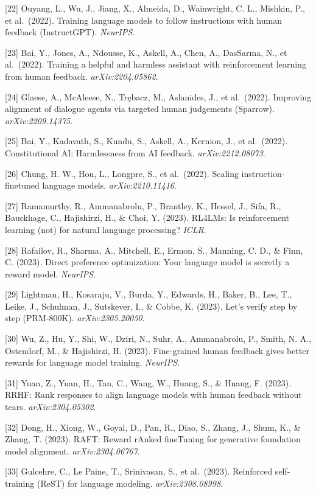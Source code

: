 {[}22{]} Ouyang, L., Wu, J., Jiang, X., Almeida, D., Wainwright, C. L., Mishkin, P., et al.~(2022). Training language models to follow instructions with human feedback (InstructGPT). \emph{NeurIPS}.

{[}23{]} Bai, Y., Jones, A., Ndousse, K., Askell, A., Chen, A., DasSarma, N., et al.~(2022). Training a helpful and harmless assistant with reinforcement learning from human feedback. \emph{arXiv:2204.05862}.

{[}24{]} Glaese, A., McAleese, N., Trębacz, M., Aslanides, J., et al.~(2022). Improving alignment of dialogue agents via targeted human judgements (Sparrow). \emph{arXiv:2209.14375}.

{[}25{]} Bai, Y., Kadavath, S., Kundu, S., Askell, A., Kernion, J., et al.~(2022). Constitutional AI: Harmlessness from AI feedback. \emph{arXiv:2212.08073}.

{[}26{]} Chung, H. W., Hou, L., Longpre, S., et al.~(2022). Scaling instruction-finetuned language models. \emph{arXiv:2210.11416}.

{[}27{]} Ramamurthy, R., Ammanabrolu, P., Brantley, K., Hessel, J., Sifa, R., Bauckhage, C., Hajishirzi, H., \& Choi, Y. (2023). RL4LMs: Is reinforcement learning (not) for natural language processing? \emph{ICLR}.

{[}28{]} Rafailov, R., Sharma, A., Mitchell, E., Ermon, S., Manning, C. D., \& Finn, C. (2023). Direct preference optimization: Your language model is secretly a reward model. \emph{NeurIPS}.

{[}29{]} Lightman, H., Kosaraju, V., Burda, Y., Edwards, H., Baker, B., Lee, T., Leike, J., Schulman, J., Sutskever, I., \& Cobbe, K. (2023). Let's verify step by step (PRM-800K). \emph{arXiv:2305.20050}.

{[}30{]} Wu, Z., Hu, Y., Shi, W., Dziri, N., Suhr, A., Ammanabrolu, P., Smith, N. A., Ostendorf, M., \& Hajishirzi, H. (2023). Fine-grained human feedback gives better rewards for language model training. \emph{NeurIPS}.

{[}31{]} Yuan, Z., Yuan, H., Tan, C., Wang, W., Huang, S., \& Huang, F. (2023). RRHF: Rank responses to align language models with human feedback without tears. \emph{arXiv:2304.05302}.

{[}32{]} Dong, H., Xiong, W., Goyal, D., Pan, R., Diao, S., Zhang, J., Shum, K., \& Zhang, T. (2023). RAFT: Reward rAnked fineTuning for generative foundation model alignment. \emph{arXiv:2304.06767}.

{[}33{]} Gulcehre, C., Le Paine, T., Srinivasan, S., et al.~(2023). Reinforced self-training (ReST) for language modeling. \emph{arXiv:2308.08998}.

